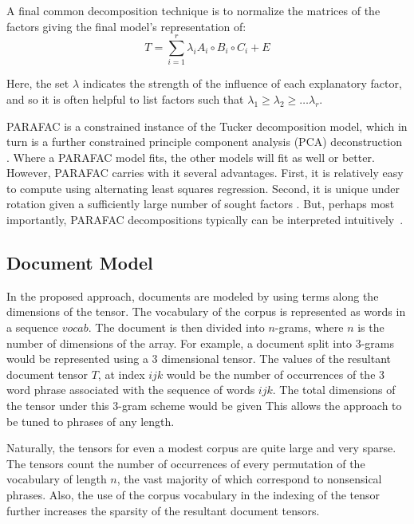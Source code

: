 \documentclass{article}
\begin{document}
A final common decomposition technique is to normalize the matrices
of the factors giving the final model's representation of:
\begin{equation}
    \label{eq:parafac-lambda}
    T = \displaystyle\sum_{i=1}^{r} \lambda_i A_i \circ B_i \circ C_i
    + E
\end{equation}

Here, the set $\lambda$ indicates the strength of the influence of
each explanatory factor, and so it is often helpful to list factors
such that $\lambda_1 \geq \lambda_2 \geq \ldots \lambda_r$.

PARAFAC is a constrained instance of the Tucker decomposition model,
which in turn is a further constrained principle component analysis
(PCA) deconstruction \cite{bro1997}.  Where a PARAFAC model fits, the
other models will fit as well or better.  However, PARAFAC carries
with it several advantages.  First, it is relatively easy to compute
using alternating least squares regression.  Second, it is unique
under rotation given a sufficiently large number of sought factors
\cite{harshman1970}.  But, perhaps most importantly, PARAFAC
decompositions typically can be interpreted
intuitively~\cite{bro1997}.  

\subsection{Document Model}
In the proposed approach, documents are modeled by using terms along
the dimensions of the tensor.  The vocabulary of the corpus is
represented as words in a sequence $vocab$. 
The document is then divided into
$n$-grams, where $n$ is the number of dimensions of the array.  For
example, a document split into 3-grams would be represented using
a 3 dimensional tensor.  The values of the resultant document tensor
$T$, at index $ijk$ would be the number of occurrences of the 3 word
phrase associated with the sequence of words $ijk$. The total
dimensions of the tensor under this 3-gram scheme would be given 
This allows the approach to be tuned to phrases of any length.  

Naturally, the tensors for even a modest corpus are quite large and
very sparse.  The tensors count the number of occurrences of every
permutation of the vocabulary of length $n$, the vast majority of
which correspond to nonsensical phrases.  Also, the use of the corpus
vocabulary in the indexing of the tensor further increases the
sparsity of the resultant document tensors.
\end{document}
